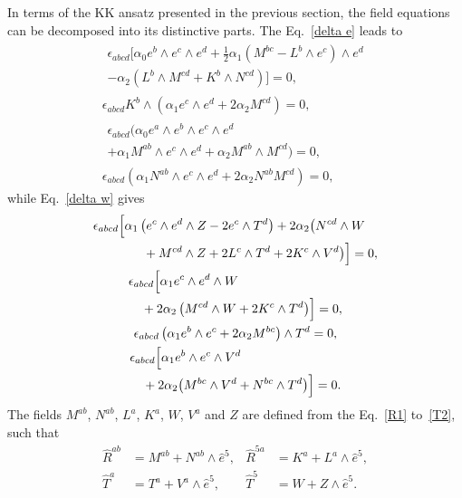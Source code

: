 \documentclass[aps,prd,12pt,superscriptaddress,showpacs,showkeys,reprint,nofootinbib]{revtex4-1}
\begin{document}
In terms of the KK ansatz presented in the previous section, the field equations can be decomposed into its distinctive parts. The Eq.~\eqref{delta e} leads to 
\setlength\multlinegap{0pt}
\begin{gather}
  \begin{multlined}
    \label{equation}
    \epsilon_{abcd}\Big[\alpha_0 e^b\wedge e^c\wedge e^d + \frac{1}{2}\alpha_1\left(M^{bc}-L^b\wedge e^c\right)\wedge e^d\\
      -\alpha_2\left(L^b\wedge M^{cd} + K^b\wedge N^{cd}\right)\Big]=0,
  \end{multlined}
  \\
  \epsilon_{abcd}K^b\wedge\left(\alpha_1e^c\wedge e^d + 2\alpha_2M^{cd}\right)=0,
  \\
  \begin{multlined}
    \epsilon_{abcd}\big(\alpha_0 e^a\wedge e^b\wedge e^c\wedge e^d \\
    +\alpha_1M^{ab}\wedge e^c\wedge e^d+\alpha_2M^{ab}\wedge M^{cd}\big)=0,
  \end{multlined}
  \\
  \epsilon_{abcd}\left(\alpha_1N^{ab}\wedge e^c\wedge e^d+2\alpha_2N^{ab}M^{cd}\right)=0,
\end{gather}
while Eq.~\eqref{delta w} gives
\setlength\multlinegap{0pt}
\begin{gather}
  \begin{multlined}
    \epsilon_{abcd}\Bigl[\alpha_1\left(e^c\wedge e^d\wedge Z-2e^c\wedge T^d\right)
      +2\alpha_2\big(N^{cd}\wedge W\\
      +M^{cd}\wedge Z+2L^c\wedge T^d
      +2K^c\wedge V^d\big)\Bigr]=0,
  \end{multlined}
  \\
  \begin{multlined}
    \epsilon_{abcd}\Bigl[\alpha_1e^c\wedge e^ d\wedge W \\
      + 2\alpha_2\left(M^{cd}\wedge W+2K^c\wedge T^d\right)\Bigr]=0,
  \end{multlined}
  \\
  \epsilon_{abcd}\left(\alpha_1e^b\wedge e^c+2\alpha_2M^{bc}\right)\wedge T^d=0,
  \\
  \begin{multlined}
    \epsilon_{abcd}\Bigl[\alpha_1e^b\wedge e^c\wedge V^d \\
      + 2\alpha_2\big(M^{bc}\wedge V^d+N^{bc}\wedge T^d\big)\Bigr]=0.
  \end{multlined}
\end{gather}
The fields $M^{ab}$, $N^{ab}$, $L^a$, $K^a$, $W$, $V^a$ and $Z$ are defined from the Eq.~\eqref{R1} to~\eqref{T2}, such that
\begin{equation}
  \begin{aligned}
    \hat{R}^{ab}&=M^{ab}+N^{ab}\wedge\hat{e}^5, & \hat{R}^{5a}&=K^a+L^a\wedge\hat{e}^5,\\
    \hat{T}^a&=T^a+V^a\wedge\hat{e}^5, & \hat{T}^5&=W+Z\wedge\hat{e}^5.
  \end{aligned}
\end{equation}
\end{document}
